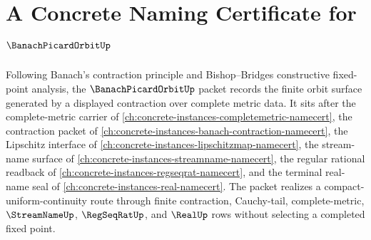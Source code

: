 \chapter{A Concrete Naming Certificate for $\BanachPicardOrbitUp$}
\label{ch:concrete-instances-banach-picard-orbit-namecert}

Following Banach's contraction principle and Bishop--Bridges constructive fixed-point analysis, the $\BanachPicardOrbitUp$ packet records the finite orbit surface generated by a displayed contraction over complete metric data. It sits after the complete-metric carrier of \autoref{ch:concrete-instances-completemetric-namecert}, the contraction packet of \autoref{ch:concrete-instances-banach-contraction-namecert}, the Lipschitz interface of \autoref{ch:concrete-instances-lipschitzmap-namecert}, the stream-name surface of \autoref{ch:concrete-instances-streamname-namecert}, the regular rational readback of \autoref{ch:concrete-instances-regseqrat-namecert}, and the terminal real-name seal of \autoref{ch:concrete-instances-real-namecert}. The packet realizes a compact-uniform-continuity route through finite contraction, Cauchy-tail, complete-metric, $\StreamNameUp$, $\RegSeqRatUp$, and $\RealUp$ rows without selecting a completed fixed point.

